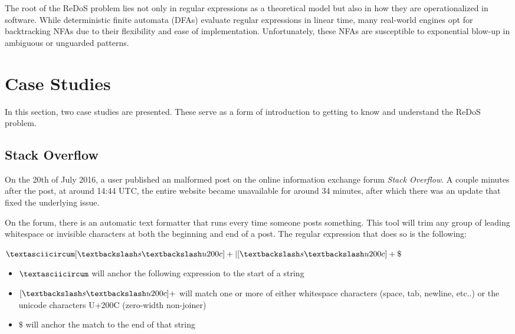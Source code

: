 The root of the ReDoS problem lies not only in regular expressions as a theoretical model but also in how they are operationalized in software. While deterministic finite automata (DFAs) evaluate regular expressions in linear time, many real-world engines opt for backtracking NFAs due to their flexibility and ease of implementation. Unfortunately, these NFAs are susceptible to exponential blow-up in ambiguous or unguarded patterns.

\section{Case Studies}
In this section, two case studies are presented. These serve as a form of introduction to getting to know and understand the ReDoS problem.

\subsection{Stack Overflow}
\label{intro:case_studies:stack_overflow}
On the 20th of July 2016, a user published an malformed post on the online information exchange forum \textit{Stack Overflow}. A couple minutes after the post, at around 14:44 UTC, the entire website became unavailable for around 34 minutes, after which there was an update that fixed the underlying issue.

On the forum, there is an automatic text formatter that runs every time someone posts something. This tool will trim any group of leading whitespace or invisible characters at both the beginning and end of a post. The regular expression that does so is the following:

\begin{center}
	$\textasciicircum [ \textbackslash s \textbackslash u200c]+|[ \textbackslash s \textbackslash u200c]+\$$
\end{center}

\begin{itemize}
	\item \textbf{$\textasciicircum$} will anchor the following expression to the start of a string
	\item \textbf{$[ \textbackslash s \textbackslash u200c]+$} will match one or more of either whitespace characters (space, tab, newline, etc..) or the unicode characters U+200C (zero-width non-joiner)
	\item \textbf{$\$$} will anchor the match to the end of that string
\end{itemize}



